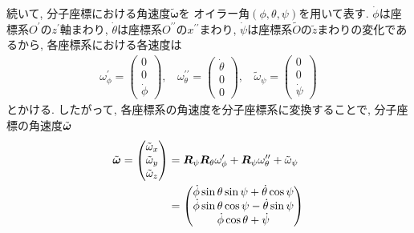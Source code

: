 続いて, 分子座標における角速度$\tilde{\bm{\omega}}$を
オイラー角$(\phi,\theta,\psi)$を用いて表す. 
$\dot{\phi}$は座標系$O^{\prime}$の$z^{\prime}$軸まわり,
$\dot{\theta}$は座標系$O^{\prime \prime}$の$x^{\prime \prime}$まわり, 
$\dot{\psi}$は座標系$\tilde{O}$の$\tilde{z}$まわりの変化であるから, 各座標系における各速度は
\begin{align}
 \omega_{\phi}^{\prime}
 =
 \begin{pmatrix}
  0 \\ 0 \\ \dot{\phi}
 \end{pmatrix}
 , ~~~~
  \omega_{\theta}^{\prime \prime}
 =
 \begin{pmatrix}
  \dot{\theta} \\ 0 \\ 0
 \end{pmatrix}
 , ~~~~
  \tilde{\omega}_{\psi}
 =
 \begin{pmatrix}
  0 \\ 0 \\ \dot{\psi}
 \end{pmatrix}
 \label{eq:RigidBodyMD5}
\end{align}
とかける. 
したがって, 各座標系の角速度を分子座標系に変換することで, 分子座標の角速度$\Tilde{\bm{\omega}}$
\begin{align}
 \tilde{\bm{\omega}}
 =
 \begin{pmatrix}
  \Tilde{\omega}_{x} \\
  \Tilde{\omega}_{y} \\
  \Tilde{\omega}_{z} \\
 \end{pmatrix}
 &=
   \bm{R}_{\psi}\bm{R}_{\theta}\omega_{\phi}^{\prime}
 + \bm{R}_{\psi}\omega_{\theta}^{\prime \prime}
 + \tilde{\omega}_{\psi}
 \notag
 \\
 &=
 \begin{pmatrix}
  \dot{\phi}\sin\theta \sin\psi + \dot{\theta}\cos\psi \\
  \dot{\phi}\sin\theta \cos\psi - \dot{\theta}\sin\psi \\
  \dot{\phi}\cos\theta + \dot{\psi}
 \end{pmatrix}
 \label{eq:RigidBodyMD6}
\end{align}
